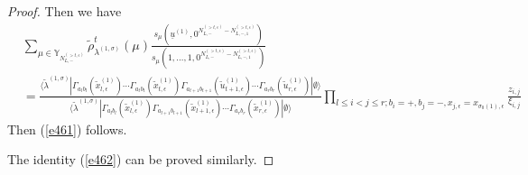 \documentclass[10pt,a4paper]{amsart}
\newcommand\YY{\mathbb{Y}}
\newcommand\si{\sigma}
\begin{document}
\begin{proof}
Then we have
\begin{align*}
&\sum_{\mu\in \YY_{N_{L,-}^{(>t,\epsilon)}}}\tilde{\rho}^t_{\lambda^{(1,\si)}}(\mu)
\frac{s_{\mu}(\underline{u}^{(1)},0^{N_{L,-}^{(>t,\epsilon)}-N_{L,-,1}^{(>t,\epsilon)}})}{s_{\mu}(1,\ldots,1,0^{N_{L,-}^{(>t,\epsilon)}-N_{L,-,1}^{(>t,\epsilon)}})}\\
&=\frac{\langle\tilde{\lambda}^{(1,\sigma)}| \Gamma_{a_lb_l}(\tilde{x}_{l,\epsilon}^{(1)})\cdots \Gamma_{a_tb_t}(\tilde{x}_{t,\epsilon}^{(1)})
\Gamma_{a_{t+1}b_{t+1}}(\tilde{u}_{t+1,\epsilon}^{(1)})\cdots \Gamma_{a_rb_r}(\tilde{u}_{r,\epsilon}^{(1)})
|\emptyset \rangle}{\langle\tilde{\lambda}^{(1,\sigma)}| \Gamma_{a_lb_l}(\tilde{x}_{l,\epsilon}^{(1)})\Gamma_{a_{l+1}b_{l+1}}(\tilde{x}_{l+1,\epsilon}^{(1)})\cdots \Gamma_{a_rb_r}(\tilde{x}_{r,\epsilon}^{(1)})|\emptyset \rangle}\prod_{l\leq i<j\leq r;b_i=+,b_j=-,x_{j,\epsilon}=x_{\sigma_0(1),\epsilon}}\frac{z_{i,j}}{\xi_{i,j}}
\end{align*}
Then (\ref{e461}) follows.

The identity (\ref{e462}) can be proved similarly.
\end{proof}
\end{document}
